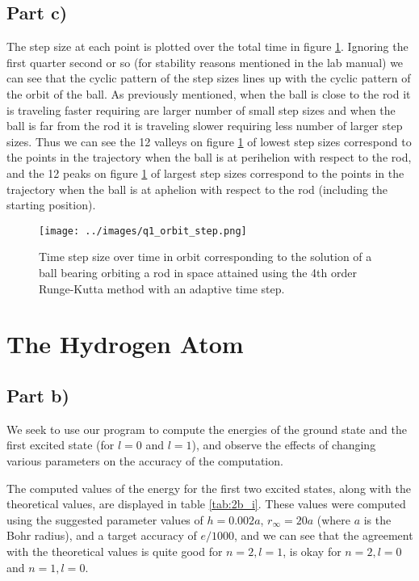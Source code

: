 \documentclass{article}
\begin{document}
\subsection{Part c)}
The step size at each point is plotted over the total time in figure \ref{fig:q1_c}. Ignoring the first quarter second or so (for stability reasons mentioned in the lab manual) we can see that the cyclic pattern of the step sizes lines up with the cyclic pattern of the orbit of the ball. As previously mentioned, when the ball is close to the rod it is traveling faster requiring are larger number of small step sizes and when the ball is far from the rod it is traveling slower requiring less number of larger step sizes. Thus we can see the 12 valleys on figure \ref{fig:q1_c} of lowest step sizes correspond to the points in the trajectory when the ball is at perihelion with respect to the rod, and the 12 peaks on figure \ref{fig:q1_c} of largest step sizes correspond to the points in the trajectory when the ball is at aphelion with respect to the rod (including the starting position).  

\begin{figure}[H]
	\centering
	\texttt{[image: ../images/q1\_orbit\_step.png]}
	\caption{Time step size over time in orbit corresponding to the solution of a ball bearing orbiting a rod in space attained using the 4th order Runge-Kutta method with an adaptive time step.}
	\label{fig:q1_c}
\end{figure}


\section{The Hydrogen Atom}

\subsection{Part b)}

We seek to use our program to compute the energies of the ground state and the first excited state (for $l=0$ and $l=1$), and observe the effects of changing various parameters on the accuracy of the computation.

The computed values of the energy for the first two excited states, along with the theoretical values, are displayed in table \ref{tab:2b_i}. These values were computed using the suggested parameter values of $h=0.002a$, $r_\infty=20a$ (where $a$ is the Bohr radius), and a target accuracy of $e/1000$, and we can see that the agreement with the theoretical values is quite good for $n=2, l=1$, is okay for $n=2, l=0$ and $n=1, l=0$.
\end{document}
